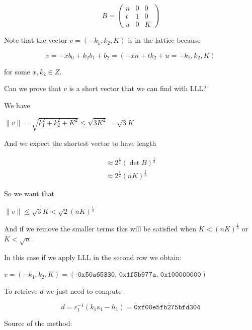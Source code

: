 \documentclass[a4paper,12pt]{report}
\begin{document}
\[
    B = 
    \begin{pmatrix}
        n & 0 & 0 \\
        t & 1 & 0 \\
        u & 0 & K
    \end{pmatrix}
\]

Note that the vector $v = (-k_1, k_2, K)$ is in the lattice because

\[
    v = -xb_0 + k_2b_1 + b_2 = (-xn + tk_2 + u = -k_1, k_2, K)
\]

for some $x, k_2 \in Z$.

\vspace*{10px}

Can we prove that $v$ is a short vector that we can find with LLL?

We have 

\begin{center}
    $\lVert v \rVert = \sqrt{k_1^2 + k_2^2 + K^2} \le \sqrt{3K^2} = \sqrt{3}K $
\end{center}

And we expect the shortest vector to have length

\[
    \begin{array}{c}
        \approx 2^{\frac{1}{2}}(\det B)^{\frac{1}{3}} \\
        \approx 2^{\frac{1}{2}}(nK)^{\frac{1}{3}}
    \end{array}
\]

So we want that 

\begin{center}
    $\lVert v \rVert \le \sqrt{3}K < \sqrt{2}(nK)^{\frac{1}{3}}$
\end{center}

And if we remove the smaller terms this will be satisfied when $K < (nK)^{\frac{1}{3}}$ or $K < \sqrt{n}$.

In this case if we apply LLL in the second row we obtain:

\begin{center}
    $v = (-k_1, k_2, K) = (\texttt{-0x50a65330, 0x1f5b977a, 0x100000000})$
\end{center}

To retrieve $d$ we just need to compute 

\[
    d = r_1^{-1}(k_1s_1 - h_1) = \texttt{0xf00e5fb275bfd304}
\]

Source of the method:

\end{document}
